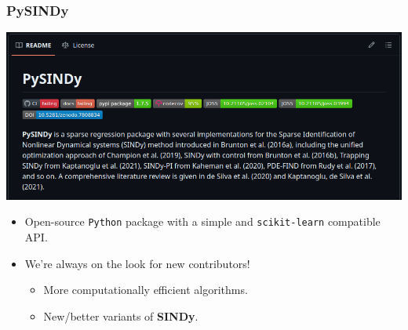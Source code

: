 \documentclass[aspectratio=169,compress,12pt]{beamer}
\begin{document}
\begin{frame}
    \frametitle{PySINDy}
    \vfill
    \begin{minipage}{.38\textwidth}
        \centering
        \vspace{-2em}
        \includegraphics[width=\textwidth]{imgs/pysindy.png}
    \end{minipage}%
    \hfill
    \begin{minipage}{.58\textwidth}
        \begin{itemize}
            \item Open-source \texttt{Python} package with a simple and \texttt{scikit-learn} compatible API.
            \par\bigskip
            \item We're always on the look for new contributors!
            \begin{itemize}
                \item More computationally efficient algorithms.
                \item New/better variants of \textbf{SINDy}.
            \end{itemize}
        \end{itemize}
    \end{minipage}
    \vfill
\end{frame}
\end{document}
